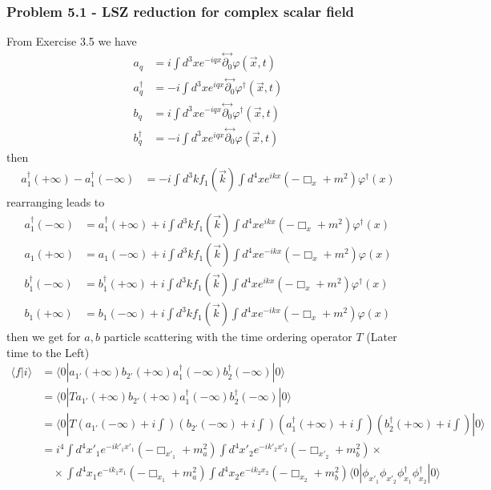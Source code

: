 \documentclass[10pt,a4paper]{book}
\theoremstyle{definition}
\begin{document}
\subsubsection{Problem 5.1 - LSZ reduction for complex scalar field}
From Exercise 3.5 we have
\begin{align}
a_q&=i\int d^3x e^{-iqx}\stackrel{\leftrightarrow}{\partial_0}\varphi(\vec{x},t)\\
a_q^\dagger&=-i\int d^3x e^{iqx}\stackrel{\leftrightarrow}{\partial_0}\varphi^\dagger(\vec{x},t)\\
b_q&=i\int d^3x e^{-iqx}\stackrel{\leftrightarrow}{\partial_0}\varphi^\dagger(\vec{x},t)\\
b_q^\dagger&=-i\int d^3x e^{iqx}\stackrel{\leftrightarrow}{\partial_0}\varphi(\vec{x},t)
\end{align}
then
\begin{align}
a^\dagger_1(+\infty)-a^\dagger_1(-\infty)
&=-i\int d^3k f_1(\vec{k})\int d^4x e^{ikx}(-\Box_x+m^2)\varphi^\dagger(x)
\end{align}
rearranging leads to
\begin{align}
a^\dagger_1(-\infty)&=a^\dagger_1(+\infty)+i\int d^3k f_1(\vec{k})\int d^4x e^{ikx}(-\Box_x+m^2)\varphi^\dagger(x)\\
a_1(+\infty)&=a_1(-\infty)+i\int d^3k f_1(\vec{k})\int d^4x e^{-ikx}(-\Box_x+m^2)\varphi(x)\\
b^\dagger_1(-\infty)&=b^\dagger_1(+\infty)+i\int d^3k f_1(\vec{k})\int d^4x e^{ikx}(-\Box_x+m^2)\varphi^\dagger(x)\\
b_1(+\infty)&=b_1(-\infty)+i\int d^3k f_1(\vec{k})\int d^4x e^{-ikx}(-\Box_x+m^2)\varphi(x)
\end{align}
then we get for $a,b$ particle scattering with the time ordering operator $T$ (Later time to the Left)
\begin{align}
\langle f|i\rangle
&=\langle 0|a_{1'}(+\infty)b_{2'}(+\infty)a^\dagger_1(-\infty)b^\dagger_2(-\infty)|0\rangle\\
&=\langle 0|Ta_{1'}(+\infty)b_{2'}(+\infty)a^\dagger_1(-\infty)b^\dagger_2(-\infty)|0\rangle\\
&=\langle 0|T(a_{1'}(-\infty)+i\int)(b_{2'}(-\infty)+i\int)(a^\dagger_{1}(+\infty)+i\int)(b^\dagger_{2}(+\infty)+i\int)|0\rangle\\
&=i^4
\int d^4x'_1e^{-ik'_1x'_1}(-\Box_{x'_1}+m_a^2)
\int d^4x'_2e^{-ik'_2x'_2}(-\Box_{x'_2}+m_b^2)\times\\
&\quad\times
\int d^4x_1e^{-ik_1x_1}(-\Box_{x_1}+m_a^2)
\int d^4x_2e^{-ik_2x_2}(-\Box_{x_2}+m_b^2)\langle0|\phi_{x'_1}\phi_{x'_2}\phi^\dagger_{x_1}\phi^\dagger_{x_2}|0\rangle
\end{align}
\end{document}

